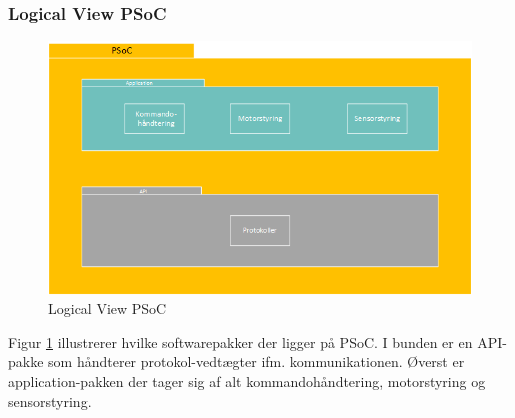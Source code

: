\subsubsection{Logical View PSoC}
\begin{figure}[H] \centering
    \includegraphics[width=\textwidth]{0_Filer/Figuer/LogicalViewPSoC.png}
    \caption{Logical View PSoC}
    \label{fig:LogicalViewPSoC}
\end{figure}
Figur \ref{fig:LogicalViewPSoC} illustrerer hvilke softwarepakker der ligger på PSoC. I bunden er en API-pakke som håndterer protokol-vedtægter ifm. kommunikationen. Øverst er application-pakken der tager sig af alt kommandohåndtering, motorstyring og sensorstyring.